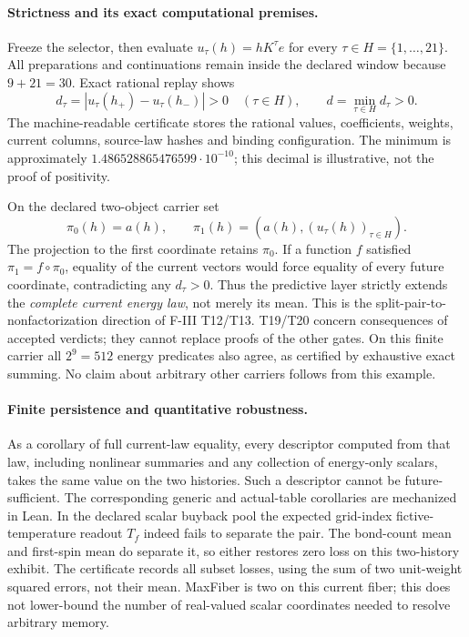 \documentclass{article}
\begin{document}
\paragraph{Strictness and its exact computational premises.}
Freeze the selector, then evaluate $u_\tau(h)=hK^\tau e$ for every
$\tau\in H=\{1,\ldots,21\}$. All preparations and continuations remain
inside the declared window because $9+21=30$. Exact rational replay shows
\[
 d_\tau=|u_\tau(h_+)-u_\tau(h_-)|>0\quad(\tau\in H),
 \qquad d=\min_{\tau\in H}d_\tau>0.
\]
The machine-readable certificate stores the rational values, coefficients,
weights, current columns, source-law hashes and binding configuration.
The minimum is approximately $1.486528865476599\cdot10^{-10}$; this decimal
is illustrative, not the proof of positivity.

On the declared two-object carrier set
\[
 \pi_0(h)=a(h),\qquad
 \pi_1(h)=(a(h),(u_\tau(h))_{\tau\in H}).
\]
The projection to the first coordinate retains $\pi_0$. If a function
$f$ satisfied $\pi_1=f\circ\pi_0$, equality of the current vectors would
force equality of every future coordinate, contradicting any $d_\tau>0$.
Thus the predictive layer strictly extends the \emph{complete current energy
law}, not merely its mean. This is the split-pair-to-nonfactorization direction
of F-III T12/T13. T19/T20 concern consequences of accepted verdicts; they
cannot replace proofs of the other gates. On this finite carrier all
$2^9=512$ energy predicates also agree, as certified by exhaustive exact
summing. No claim about arbitrary other carriers follows from this example.

\paragraph{Finite persistence and quantitative robustness.}
As a corollary of full current-law equality, every descriptor computed from
that law, including nonlinear summaries and any collection of energy-only
scalars, takes the same value on the two histories. Such a descriptor cannot
be future-sufficient. The corresponding generic and actual-table corollaries
are mechanized in Lean. In the declared scalar buyback pool the expected
grid-index fictive-temperature readout $T_f$ indeed fails to separate the
pair. The bond-count mean and first-spin mean do separate it, so either
restores zero loss on this two-history exhibit. The certificate records all
subset losses, using the sum of two unit-weight squared errors, not their
mean. MaxFiber is two on this current fiber; this does not lower-bound the
number of real-valued scalar coordinates needed to resolve arbitrary memory.
\end{document}
